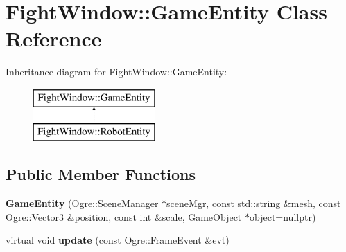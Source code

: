 \hypertarget{class_fight_window_1_1_game_entity}{}\section{Fight\+Window\+:\+:Game\+Entity Class Reference}
\label{class_fight_window_1_1_game_entity}
Inheritance diagram for Fight\+Window\+:\+:Game\+Entity\+:\begin{figure}[H]
\begin{center}
\leavevmode
\includegraphics[height=2.000000cm]{class_fight_window_1_1_game_entity}
\end{center}
\end{figure}
\subsection*{Public Member Functions}
\begin{DoxyCompactItemize}
\item 
{\bfseries Game\+Entity} (Ogre\+::\+Scene\+Manager $\ast$scene\+Mgr, const std\+::string \&mesh, const Ogre\+::\+Vector3 \&position, const int \&scale, \hyperlink{class_game_object}{Game\+Object} $\ast$object=nullptr)\hypertarget{class_fight_window_1_1_game_entity_a984f2e6b2fdcdf778e4e2294542f3349}{}\label{class_fight_window_1_1_game_entity_a984f2e6b2fdcdf778e4e2294542f3349}

\item 
virtual void {\bfseries update} (const Ogre\+::\+Frame\+Event \&evt)\hypertarget{class_fight_window_1_1_game_entity_a5adcae63b3072bacdb0bbc80de8c8767}{}\label{class_fight_window_1_1_game_entity_a5adcae63b3072bacdb0bbc80de8c8767}

\end{DoxyCompactItemize}
